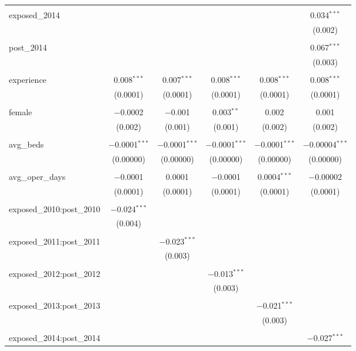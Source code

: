 \begin{table}[!htbp]
\begin{adjustbox}{width=\textwidth}
\begin{tabular}{@{\extracolsep{5pt}}lccccc}
  & & & & & \\ 
 exposed\_2014 &  &  &  &  & 0.034$^{***}$ \\ 
  &  &  &  &  & (0.002) \\ 
  & & & & & \\ 
 post\_2014 &  &  &  &  & 0.067$^{***}$ \\ 
  &  &  &  &  & (0.003) \\ 
  & & & & & \\ 
 experience & 0.008$^{***}$ & 0.007$^{***}$ & 0.008$^{***}$ & 0.008$^{***}$ & 0.008$^{***}$ \\ 
  & (0.0001) & (0.0001) & (0.0001) & (0.0001) & (0.0001) \\ 
  & & & & & \\ 
 female & $-$0.0002 & $-$0.001 & 0.003$^{**}$ & 0.002 & 0.001 \\ 
  & (0.002) & (0.001) & (0.001) & (0.002) & (0.002) \\ 
  & & & & & \\ 
 avg\_beds & $-$0.0001$^{***}$ & $-$0.0001$^{***}$ & $-$0.0001$^{***}$ & $-$0.0001$^{***}$ & $-$0.00004$^{***}$ \\ 
  & (0.00000) & (0.00000) & (0.00000) & (0.00000) & (0.00000) \\ 
  & & & & & \\ 
 avg\_oper\_days & $-$0.0001 & 0.0001 & $-$0.0001 & 0.0004$^{***}$ & $-$0.00002 \\ 
  & (0.0001) & (0.0001) & (0.0001) & (0.0001) & (0.0001) \\ 
  & & & & & \\ 
 exposed\_2010:post\_2010 & $-$0.024$^{***}$ &  &  &  &  \\ 
  & (0.004) &  &  &  &  \\ 
  & & & & & \\ 
 exposed\_2011:post\_2011 &  & $-$0.023$^{***}$ &  &  &  \\ 
  &  & (0.003) &  &  &  \\ 
  & & & & & \\ 
 exposed\_2012:post\_2012 &  &  & $-$0.013$^{***}$ &  &  \\ 
  &  &  & (0.003) &  &  \\ 
  & & & & & \\ 
 exposed\_2013:post\_2013 &  &  &  & $-$0.021$^{***}$ &  \\ 
  &  &  &  & (0.003) &  \\ 
  & & & & & \\ 
 exposed\_2014:post\_2014 &  &  &  &  & $-$0.027$^{***}$ \\ 

\end{tabular}
\end{adjustbox}
\end{table}
